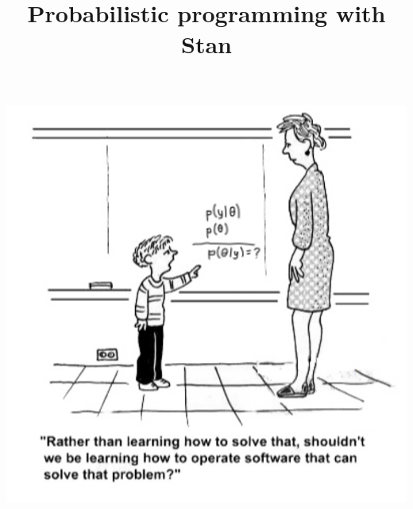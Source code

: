 

\title[Stan]{Probabilistic programming with Stan}



\begin{frame}

\centering
\includegraphics[width=0.60\linewidth]{../LectureAssets/L03/Lecture03Cartoon}
\end{frame}



